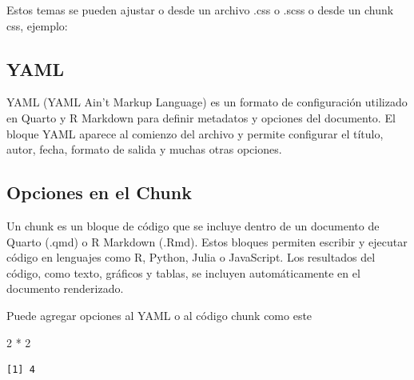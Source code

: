 \documentclass[
  10pt,
]{article}
\newenvironment{Shaded}{\begin{snugshade}}{\end{snugshade}}
\newcommand{\DecValTok}[1]{\textcolor[rgb]{0.68,0.00,0.00}{#1}}
\newcommand{\SpecialCharTok}[1]{\textcolor[rgb]{0.37,0.37,0.37}{#1}}
\begin{document}
Estos temas se pueden ajustar o desde un archivo .css o .scss o desde un
chunk css, ejemplo:

\subsection{YAML}\label{yaml}

YAML (YAML Ain't Markup Language) es un formato de configuración
utilizado en Quarto y R Markdown para definir metadatos y opciones del
documento. El bloque YAML aparece al comienzo del archivo y permite
configurar el título, autor, fecha, formato de salida y muchas otras
opciones.

\subsection{Opciones en el Chunk}\label{opciones-en-el-chunk}

Un chunk es un bloque de código que se incluye dentro de un documento de
Quarto (.qmd) o R Markdown (.Rmd). Estos bloques permiten escribir y
ejecutar código en lenguajes como R, Python, Julia o JavaScript. Los
resultados del código, como texto, gráficos y tablas, se incluyen
automáticamente en el documento renderizado.

Puede agregar opciones al YAML o al código chunk como este

\begin{Shaded}
\begin{Highlighting}[]
\DecValTok{2} \SpecialCharTok{*} \DecValTok{2}
\end{Highlighting}
\end{Shaded}

\begin{verbatim}
[1] 4
\end{verbatim}
\end{document}
